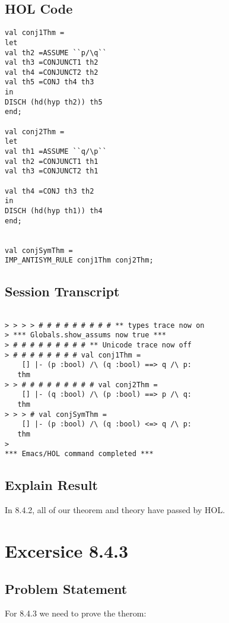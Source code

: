 \documentclass{report}
\begin{document}
\section{HOL Code}
\label{HOl Code 842}

\begin{lstlisting}[frame=trBL]
val conj1Thm =
let
val th2 =ASSUME ``p/\q``
val th3 =CONJUNCT1 th2
val th4 =CONJUNCT2 th2
val th5 =CONJ th4 th3
in
DISCH (hd(hyp th2)) th5
end;

val conj2Thm =
let
val th1 =ASSUME ``q/\p``
val th2 =CONJUNCT1 th1
val th3 =CONJUNCT2 th1

val th4 =CONJ th3 th2
in
DISCH (hd(hyp th1)) th4
end;


val conjSymThm =
IMP_ANTISYM_RULE conj1Thm conj2Thm;
\end{lstlisting}

\section{Session Transcript}
\label{Session Trans 842}
\setcounter{sessioncount}{0}
\begin{session}
  \begin{scriptsize}
\begin{verbatim}

> > > > # # # # # # # # # ** types trace now on
> *** Globals.show_assums now true ***
> # # # # # # # # # ** Unicode trace now off
> # # # # # # # # val conj1Thm =
    [] |- (p :bool) /\ (q :bool) ==> q /\ p:
   thm
> > # # # # # # # # # val conj2Thm =
    [] |- (q :bool) /\ (p :bool) ==> p /\ q:
   thm
> > > # val conjSymThm =
    [] |- (p :bool) /\ (q :bool) <=> q /\ p:
   thm
> 
*** Emacs/HOL command completed ***

\end{verbatim}
  \end{scriptsize}
\end{session}
\section{Explain Result}
\label{explain result 842}
In 8.4.2, all of our theorem and theory have passed by HOL.


\chapter{Excersice 8.4.3}
\label{Ex 843}
\section{Problem Statement}
\label{Problem State 843}
For 8.4.3 we need to prove the therom:
\HOLprojFiveTheoremsconjSymAll
\end{document}
